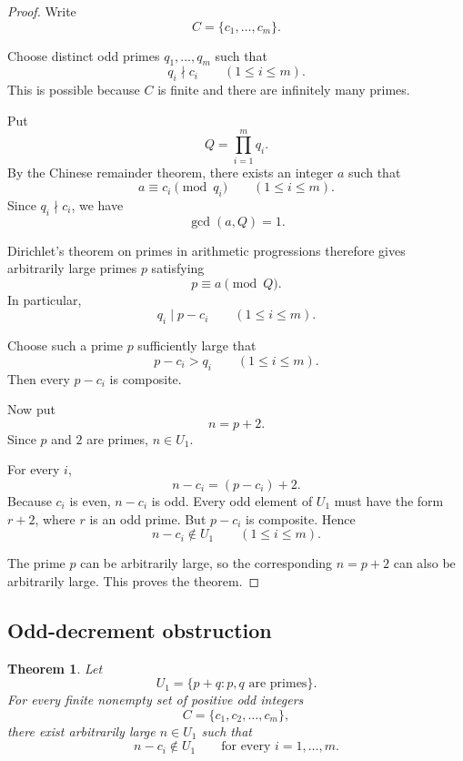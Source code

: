 \documentclass[11pt]{article}
\newtheorem{theorem}{Theorem}
\begin{document}
	\begin{proof}
		Write
		\[
		C=\{c_1,\ldots,c_m\}.
		\]
		
		Choose distinct odd primes $q_1,\ldots,q_m$ such that
		\[
		q_i\nmid c_i
		\qquad (1\le i\le m).
		\]
		This is possible because $C$ is finite and there are infinitely
		many primes.
		
		Put
		\[
		Q=\prod_{i=1}^m q_i.
		\]
		By the Chinese remainder theorem, there exists an integer $a$
		such that
		\[
		a\equiv c_i\pmod{q_i}
		\qquad (1\le i\le m).
		\]
		Since $q_i\nmid c_i$, we have
		\[
		\gcd(a,Q)=1.
		\]
		
		Dirichlet's theorem on primes in arithmetic progressions
		therefore gives arbitrarily large primes $p$ satisfying
		\[
		p\equiv a\pmod Q.
		\]
		In particular,
		\[
		q_i\mid p-c_i
		\qquad (1\le i\le m).
		\]
		
		Choose such a prime $p$ sufficiently large that
		\[
		p-c_i>q_i
		\qquad (1\le i\le m).
		\]
		Then every $p-c_i$ is composite.
		
		Now put
		\[
		n=p+2.
		\]
		Since $p$ and $2$ are primes, $n\in U_1$.
		
		For every $i$,
		\[
		n-c_i=(p-c_i)+2.
		\]
		Because $c_i$ is even, $n-c_i$ is odd. Every odd element
		of $U_1$ must have the form $r+2$, where $r$ is an odd prime.
		But $p-c_i$ is composite. Hence
		\[
		n-c_i\notin U_1
		\qquad (1\le i\le m).
		\]
		
		The prime $p$ can be arbitrarily large, so the corresponding
		$n=p+2$ can also be arbitrarily large. This proves the theorem.
	\end{proof}
	
	\subsection{Odd-decrement obstruction}
	
	\begin{theorem}\label{odddecu}
		Let
		\[
		U_1=\{p+q:p,q\text{ are primes}\}.
		\]
		For every finite nonempty set of positive odd integers
		\[
		C=\{c_1,c_2,\ldots,c_m\},
		\]
		there exist arbitrarily large \(n\in U_1\) such that
		\[
		n-c_i\notin U_1
		\qquad\text{for every }i=1,\ldots,m.
		\]
	\end{theorem}
	
\end{document}

